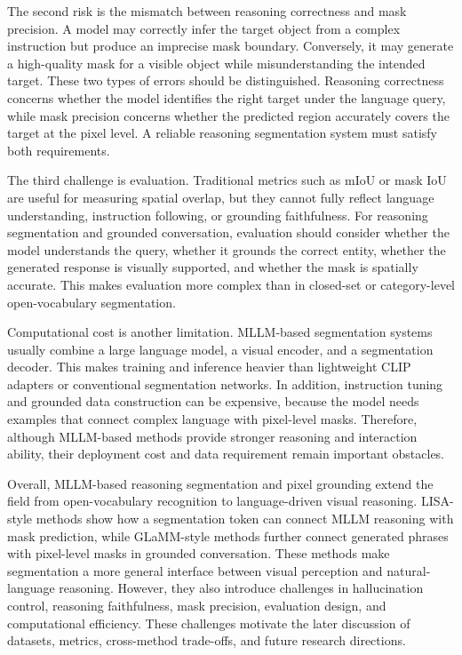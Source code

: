 The second risk is the mismatch between reasoning correctness and mask precision. 
A model may correctly infer the target object from a complex instruction but produce an imprecise mask boundary. 
Conversely, it may generate a high-quality mask for a visible object while misunderstanding the intended target. 
These two types of errors should be distinguished. 
Reasoning correctness concerns whether the model identifies the right target under the language query, while mask precision concerns whether the predicted region accurately covers the target at the pixel level. 
A reliable reasoning segmentation system must satisfy both requirements.

The third challenge is evaluation. 
Traditional metrics such as mIoU or mask IoU are useful for measuring spatial overlap, but they cannot fully reflect language understanding, instruction following, or grounding faithfulness. 
For reasoning segmentation and grounded conversation, evaluation should consider whether the model understands the query, whether it grounds the correct entity, whether the generated response is visually supported, and whether the mask is spatially accurate. 
This makes evaluation more complex than in closed-set or category-level open-vocabulary segmentation.

Computational cost is another limitation. 
MLLM-based segmentation systems usually combine a large language model, a visual encoder, and a segmentation decoder. 
This makes training and inference heavier than lightweight CLIP adapters or conventional segmentation networks. 
In addition, instruction tuning and grounded data construction can be expensive, because the model needs examples that connect complex language with pixel-level masks. 
Therefore, although MLLM-based methods provide stronger reasoning and interaction ability, their deployment cost and data requirement remain important obstacles.

Overall, MLLM-based reasoning segmentation and pixel grounding extend the field from open-vocabulary recognition to language-driven visual reasoning. 
LISA-style methods show how a segmentation token can connect MLLM reasoning with mask prediction, while GLaMM-style methods further connect generated phrases with pixel-level masks in grounded conversation. 
These methods make segmentation a more general interface between visual perception and natural-language reasoning. 
However, they also introduce challenges in hallucination control, reasoning faithfulness, mask precision, evaluation design, and computational efficiency. 
These challenges motivate the later discussion of datasets, metrics, cross-method trade-offs, and future research directions.

